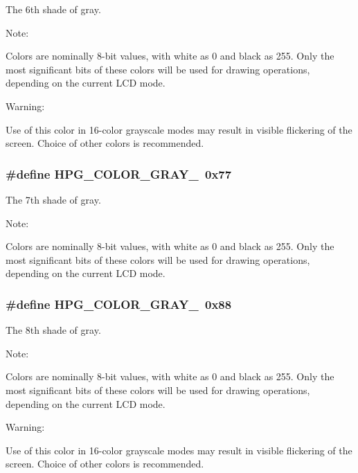 The 6th shade of gray.

\begin{Desc}
\item[Note: ]\par
Colors are nominally 8-bit values, with white as 0 and black as 255. Only the most significant bits of these colors will be used for drawing operations, depending on the current LCD mode.\end{Desc}
\begin{Desc}
\item[Warning: ]\par
Use of this color in 16-color grayscale modes may result in visible flickering of the screen. Choice of other colors is recommended. \end{Desc}
\subsubsection{\setlength{\rightskip}{0pt plus 5cm}\#define HPG\_\-COLOR\_\-GRAY\_\ 0x77}\label{hpgraphics_8h_a9}


The 7th shade of gray.

\begin{Desc}
\item[Note: ]\par
Colors are nominally 8-bit values, with white as 0 and black as 255. Only the most significant bits of these colors will be used for drawing operations, depending on the current LCD mode. \end{Desc}
\subsubsection{\setlength{\rightskip}{0pt plus 5cm}\#define HPG\_\-COLOR\_\-GRAY\_\ 0x88}\label{hpgraphics_8h_a10}


The 8th shade of gray.

\begin{Desc}
\item[Note: ]\par
Colors are nominally 8-bit values, with white as 0 and black as 255. Only the most significant bits of these colors will be used for drawing operations, depending on the current LCD mode.\end{Desc}
\begin{Desc}
\item[Warning: ]\par
Use of this color in 16-color grayscale modes may result in visible flickering of the screen. Choice of other colors is recommended. \end{Desc}
